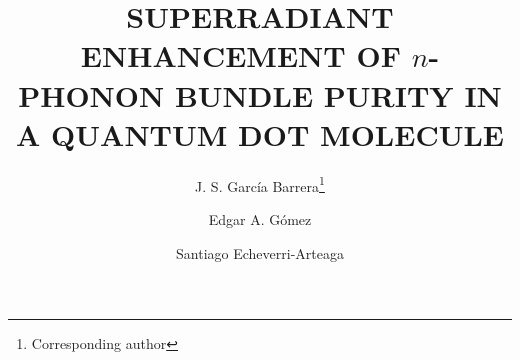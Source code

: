 \documentclass{ws-ijmpb}
\begin{document}
\renewcommand*\footnoterule{}
\newcommand{\ket}[1]{\left| #1 \right>} %
\newcommand{\bra}[1]{\left< #1 \right|} %
\newcommand{\braket}[2]{\left< #1 \vphantom{#2} \right| \left. #2 \vphantom{#1} \right>} %
\newcommand{\meanv}[1]{\left< #1 \vphantom{#1} \right>} %
\newcommand{\pd}[2]{\frac{\partial #1}{\partial #2}} 
\newcommand{\abs}[1]{\left| #1 \vphantom{#1} \right|} %
\newcommand{\meanvop}[3]{\left< #1 \left| #2 \right| #3 \right>} %
\newcommand{\Lindblad}[2]{\frac{#1}{2}\mathcal{L}_{#2}\left(\hat{\rho}\right)}
\newcommand{\tr}{\mbox{tr}}



%
\catchline{}{}{}{}{}
%


\title{SUPERRADIANT ENHANCEMENT OF $n$-PHONON BUNDLE PURITY IN A QUANTUM DOT MOLECULE}

\author{J. S. García Barrera\footnote{Corresponding author}}

\address{Grupo de física teórica y computacional, Programa de Física,\\
Universidad del Quindío, AA 630004, Armenia, Colombia\\
jhons.garciab@uqvirtual.edu.co}

\author{Edgar A. Gómez}

\address{Grupo de física teórica y computacional, Programa de Física,\\
Universidad del Quindío, AA 630004, Armenia, Colombia\\
eagomez@uniquindio.edu.co}

\author{Santiago Echeverri-Arteaga}

\address{Grupo de física teórica y computacional, Programa de Física,\\
Universidad del Quindío, AA 630004, Armenia, Colombia\\
secheverri@uniquindio.edu.co}

\maketitle
\end{document}
